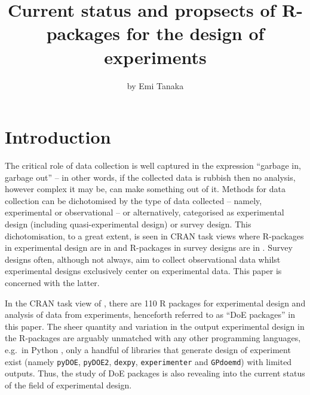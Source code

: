 \title{Current status and propsects of R-packages for the design of
experiments}
\author{by Emi Tanaka}

\maketitle


\hypertarget{introduction}{%
\section{Introduction}\label{introduction}}

The critical role of data collection is well captured in the expression
``garbage in, garbage out'' -- in other words, if the collected data is
rubbish then no analysis, however complex it may be, can make something
out of it. Methods for data collection can be dichotomised by the type
of data collected -- namely, experimental or observational -- or
alternatively, categorised as experimental design (including
quasi-experimental design) or survey design. This dichotomisation, to a
great extent, is seen in CRAN task views where R-packages in
experimental design are in  and R-packages in
survey designs are in . Survey designs often,
although not always, aim to collect observational data whilst
experimental designs exclusively center on experimental data. This paper
is concerned with the latter.

In the CRAN task view of , there are 110 R
packages for experimental design and analysis of data from experiments,
henceforth referred to as ``DoE packages'' in this paper. The sheer
quantity and variation in the output experimental design in the
R-packages are arguably unmatched with any other programming languages,
e.g.~in Python \citep{python}, only a handful of libraries that generate
design of experiment exist (namely \texttt{pyDOE}, \texttt{pyDOE2},
\texttt{dexpy}, \texttt{experimenter} and \texttt{GPdoemd}) with limited
outputs. Thus, the study of DoE packages is also revealing into the
current status of the field of experimental design.

